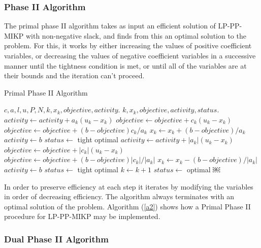 \documentclass[a4paper,11pt]{article}
\begin{document}
\subsubsection{Phase II Algorithm}

The primal phase II algorithm takes as input an efficient solution of LP-PP-MIKP with non-negative slack, and finds from this an optimal solution to the problem. For this, it works by either increasing the values of positive coefficient variables, or decreasing the values of negative coefficient variables in a successive manner until the tightness condition is met, or until all of the variables are at their bounds and the iteration can’t proceed.

\begin{algorithm}
\caption{Primal Phase II Algorithm}
\label{a2}
\begin{algorithmic}[1] 
\REQUIRE $c,a,l,u, P,N, k, x_k, objective, activity.$
\ENSURE $k, x_k, objective, activity, status.$
			\STATE $activity\leftarrow activity+a_k(u_k-x_k)$
			\STATE $objective\leftarrow objective+c_k(u_k-x_k)$
		\ELSE 
			\STATE $objective\leftarrow objective+(b-objective)c_k/a_k$
			\STATE $x_k\leftarrow x_k + (b-objective)/a_k$
			\STATE $activity\leftarrow b$
			\STATE $status\leftarrow$ tight optimal
			\RETURN
		\ENDIF
	\ELSE
			\STATE $activity\leftarrow activity+|a_k|(u_k-x_k)$
			\STATE $objective\leftarrow objective+|c_k|(u_k-x_k)$
		\ELSE 
			\STATE $objective\leftarrow objective+(b-objective)|c_k|/|a_k|$
			\STATE $x_k\leftarrow x_k - (b-objective)/|a_k|$
			\STATE $activity\leftarrow b$
			\STATE $status\leftarrow$ tight optimal
			\RETURN
		\ENDIF
	\ENDIF
	\STATE $k\leftarrow k+1$
\ENDWHILE
\STATE $status\leftarrow$ optimal
\RETURN
￼
\end{algorithmic} 
\end{algorithm}
In order to preserve efficiency at each step it iterates by modifying the variables in order of decreasing efficiency. The algorithm always terminates with an optimal solution of the problem. Algorithm (\ref{a2}) shows how a Primal Phase II procedure for LP-PP-MIKP may be implemented.

\subsubsection{Dual Phase II Algorithm}
\end{document}
